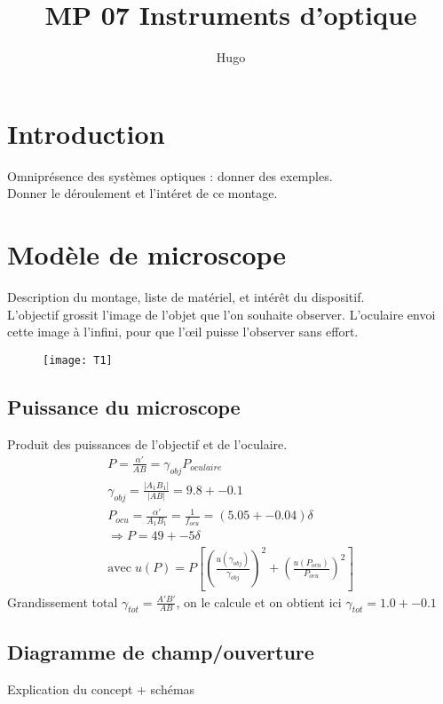 \documentclass[12pt,prb,aps,epsf]{report}
\begin{document}
	
	\title{MP 07 Instruments d'optique}
	\author{Hugo}
	
	\maketitle
	
	\tableofcontents
	
	\pagebreak
	
	
\section{Introduction}
Omniprésence des systèmes optiques : donner des exemples.\\
Donner le déroulement et l'intéret de ce montage.	

\section{Modèle de microscope}
Description du montage, liste de matériel, et intérêt du dispositif.\\

L'objectif grossit l'image de l'objet que l'on souhaite observer. L'oculaire envoi cette image à l'infini, pour que l'œil puisse l'observer sans effort.
\begin{figure}
	\centerline{\texttt{[image: T1]}}
\end{figure}

\subsection{Puissance du microscope}

Produit des puissances de l'objectif et de l'oculaire.
\begin{eqnarray}
P = \frac{\alpha'}{AB} = \gamma_{obj}P_{oculaire}\\
\gamma_{obj} = \frac{|A_1B_1|}{|AB|} = 9.8 +-0.1\\
P_{ocu} = \frac{\alpha'}{A_1B_1} = \frac{1}{f_{ocu}}=(5.05+-0.04) \delta\\
\Rightarrow P = 49 +- 5 \delta\\
\mathrm{avec}\; u(P) = P\left[\left(\frac{u(\gamma_{obj})}{\gamma_{obj}}\right)^2+\left(\frac{u(P_{ocu})}{P_{ocu}}\right)^2\right]
\end{eqnarray}
Grandissement total $\gamma_{tot} = \frac{A'B'}{AB}$, on le calcule et on obtient ici $\gamma_{tot} = 1.0+-0.1$

\subsection{Diagramme de champ/ouverture}
Explication du concept + schémas
\end{document}
